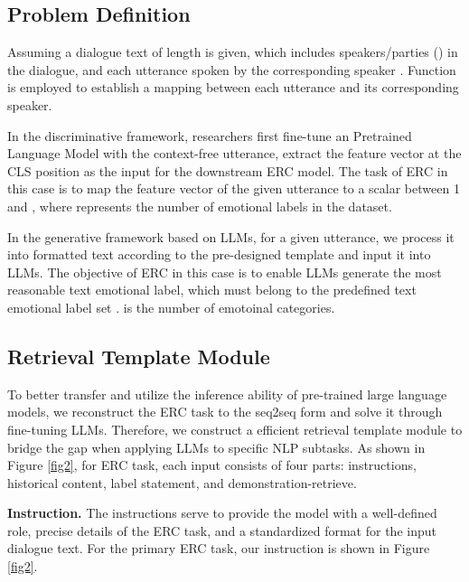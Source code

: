 \documentclass[conference]{IEEEtran}
\begin{document}
\subsection{Problem Definition}
Assuming a dialogue text  of length  is given, which includes  speakers/parties  () in the dialogue, and each utterance  spoken by the corresponding speaker . Function  is employed to establish a mapping between each utterance and its corresponding speaker.

In the discriminative framework, researchers first fine-tune an Pretrained Language Model with the context-free utterance, extract the feature vector at the CLS position as the input for the downstream ERC model. The task of ERC in this case is to map the feature vector of the given utterance to a scalar between 1 and , where  represents the number of emotional labels in the dataset.

In the generative framework based on LLMs, for a given utterance, we process it into formatted text according to the pre-designed template and input it into LLMs. The objective of ERC in this case is to enable LLMs generate the most reasonable text emotional label, which must belong to the predefined text emotional label set .  is the number of emotoinal categories.




\subsection{Retrieval Template Module}
To better transfer and utilize the inference ability of pre-trained large language models, we reconstruct the ERC task to the seq2seq form and solve it through fine-tuning LLMs. Therefore, we construct a efficient retrieval template module to bridge the gap when applying LLMs to specific NLP subtasks. As shown in Figure \ref{fig2}, for ERC task, each input consists of four parts: instructions, historical content, label statement, and demonstration-retrieve.



\textbf{Instruction.} The instructions serve to provide the model with a well-defined role, precise details of the ERC task, and a standardized format for the input dialogue text. For the primary ERC task, our instruction  is shown in Figure \ref{fig2}. 
\end{document}
